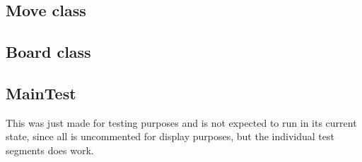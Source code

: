 \documentclass[12pt, a4paper]{article}
\begin{document}
\subsection{Move class}

\subsection{Board class}

\subsection{MainTest}
This was just made for testing purposes and is not expected to run in its current state, since all is uncommented for display purposes, but the individual test segments does work.

\end{document}
